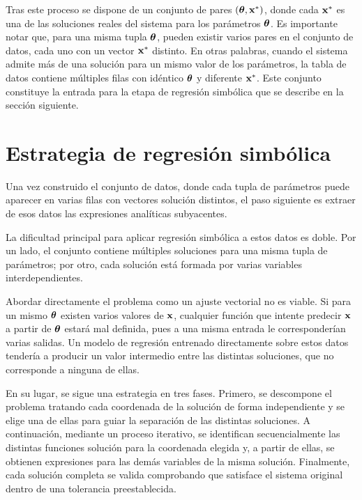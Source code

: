 Tras este proceso se dispone de un conjunto de pares
\((\boldsymbol{\theta}, \mathbf{x}^*)\), donde cada \(\mathbf{x}^*\) es una de las
soluciones reales del sistema para los parámetros \(\boldsymbol{\theta}\). Es importante notar que, para una misma tupla \(\boldsymbol{\theta}\), pueden existir varios pares en el conjunto de datos, cada uno con un vector
\(\mathbf{x}^*\) distinto. En otras palabras, cuando el sistema admite más
de una solución para un mismo valor de los parámetros, la tabla de datos contiene múltiples filas con idéntico \(\boldsymbol{\theta}\) y diferente
\(\mathbf{x}^*\). Este conjunto constituye la entrada para la etapa de
regresión simbólica que se describe en la sección siguiente.


\section{Estrategia de regresión simbólica}
\label{sec:estrategia_sr}

Una vez construido el conjunto de datos, donde cada tupla de parámetros puede aparecer en varias filas con vectores solución distintos, el paso siguiente es extraer de esos datos las expresiones analíticas subyacentes.

La dificultad principal para aplicar regresión simbólica a estos datos es doble. Por un lado, el conjunto contiene múltiples soluciones para una misma tupla de parámetros; por otro, cada solución está formada por varias variables interdependientes.

Abordar directamente el problema como un ajuste vectorial no es viable. Si para un mismo \(\boldsymbol{\theta}\) existen varios valores de \(\mathbf{x}\), cualquier función que intente predecir \(\mathbf{x}\) a partir de
\(\boldsymbol{\theta}\) estará mal definida, pues a una misma entrada le
corresponderían varias salidas. Un modelo de regresión entrenado directamente sobre estos datos tendería a producir un valor intermedio entre las distintas soluciones, que no corresponde a ninguna de ellas.

En su lugar, se sigue una estrategia en tres fases. Primero, se descompone el problema tratando cada coordenada de la solución de forma independiente y se elige una de ellas para guiar la separación de las distintas soluciones. A continuación, mediante un proceso iterativo, se identifican secuencialmente las distintas funciones solución para la coordenada elegida y, a partir de ellas, se obtienen expresiones para las demás variables de la misma solución. Finalmente, cada solución completa se valida comprobando que satisface el sistema original dentro de una tolerancia preestablecida.


